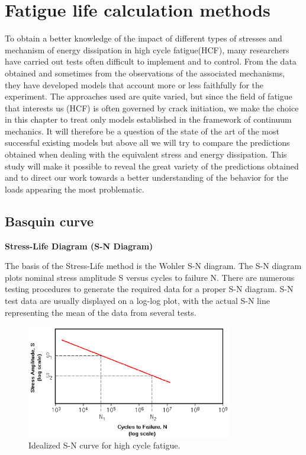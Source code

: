 \chapter{Fatigue life calculation methods}\label{chp:2}
\minitoc

To obtain a better knowledge of the impact of different types of stresses and mechanism of energy dissipation in high cycle fatigue(HCF), many researchers have carried out tests often difficult to implement and to control. From the data obtained and sometimes from the observations of the associated mechanisms, they have developed models that account more or less faithfully for the experiment. The approaches used are quite varied, but since the field of fatigue that interests us (HCF) is often governed by crack initiation, we make the choice in this chapter to treat only models established in the framework of continuum mechanics. It will therefore be a question of the state of the art of the most successful existing models but above all we will try to compare the predictions obtained when dealing with the equivalent stress and energy dissipation. This study will make it possible to reveal the great variety of the predictions obtained and to direct our work towards a better understanding of the behavior for the loads appearing the most problematic.



\section{Basquin curve}

\vspace{6pt}
\textbf{Stress-Life Diagram (S-N Diagram)}

The basis of the Stress-Life method is the Wohler S-N diagram. The S-N diagram plots nominal stress amplitude S versus cycles to
failure N. There are numerous testing procedures to generate the required data for a proper
S-N diagram. S-N test data are usually displayed on a log-log plot, with the actual S-N line
representing the mean of the data from several tests.

\begin{figure}[h!]
	\centering
	\includegraphics[width=0.8\textwidth]{figures//basquin.png} 
	\caption{Idealized S-N curve for high cycle fatigue.}
	\label{fig.basquin}
\end{figure}

